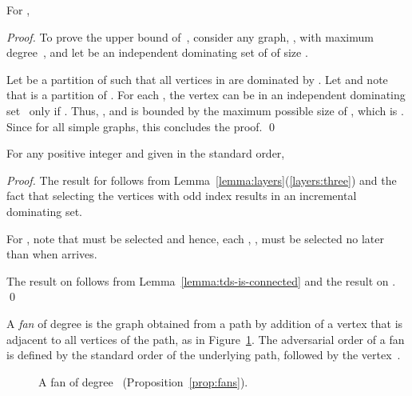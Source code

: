 \begin{proposition}
\label{prop:ids-onopt-upper}
For \ids, \, 
\end{proposition}
\begin{proof}
To prove the upper bound of~, consider any graph, , with
maximum degree~, and
let 
 be an independent dominating 
set of  of size .

Let  be a partition of  such that all vertices in  
are dominated by . Let  and note that 
 is a partition of .
For each , the vertex  can be in an independent dominating set~
only if .
Thus, , and
 is bounded by the maximum possible size of , which
is .
Since  for all simple graphs, this concludes the proof.
\qed\end{proof}

\begin{lemma}
\label{lemma:path}
For any positive integer  and  given in the standard order, 

\end{lemma}
\begin{proof}
The result for  follows from
Lemma~\ref{lemma:layers}(\ref{layers:three}) and
the fact that selecting the vertices with odd index results in an
incremental dominating set.

For , note that  must be selected and hence, each
, , must be selected no later than when
 arrives.

The result on  follows from
Lemma~\ref{lemma:tds-is-connected} and the result on . 
\qed\end{proof}

A \emph{fan} of degree  is the graph obtained from a path  
by addition of a vertex  that is adjacent to all
vertices of the path, as in Figure~\ref{fig:fan}. The adversarial 
order of a fan is defined by the standard order of the underlying path,
followed by the vertex~.

\begin{figure}[!htb]
\begin{center}
\caption{A fan of degree~ (Proposition~\ref{prop:fans}).
\label{fig:fan}}
\end{center}
\end{figure}

